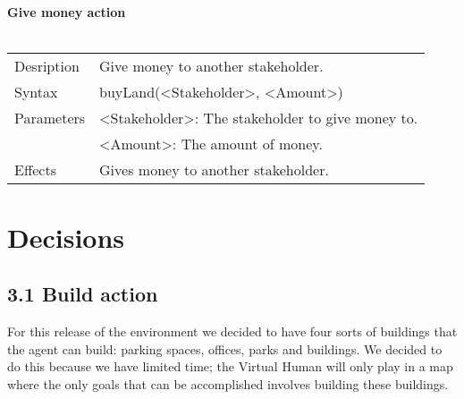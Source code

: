 \documentclass[english,11pt]{report}
\begin{document}
\\
\\
\textbf{Give money action}\\
\\
\begin{tabularx}{\textwidth}{lX}
 Desription & Give money to another stakeholder. \\
 Syntax & buyLand(<Stakeholder>, <Amount>) \\
 Parameters & <Stakeholder>: The stakeholder to give money to.\\
            & <Amount>: The amount of money.\\
 Effects &  Gives money to another stakeholder.
\end{tabularx}

\chapter{Decisions}

\section*{3.1 Build action}
For this release of the environment we decided to have four sorts of buildings that the agent can build: parking spaces, offices, parks and buildings. We decided to do this because we have limited time; the Virtual Human will only play in a map where the only goals that can be accomplished involves building these buildings.
\end{document}
